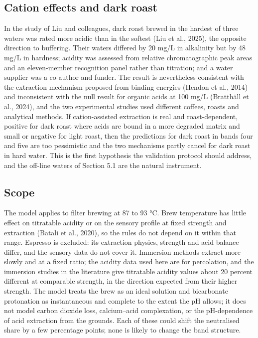 \documentclass[
  a4paper,
]{article}
\newcounter{none} %
\begin{document}
\subsection{Cation effects and dark
roast}\label{cation-effects-and-dark-roast}

In the study of Liu and colleagues, dark roast brewed in the hardest of
three waters was rated more acidic than in the softest (Liu et al.,
2025), the opposite direction to buffering. Their waters differed by 20
mg/L in alkalinity but by 48 mg/L in hardness; acidity was assessed from
relative chromatographic peak areas and an eleven-member recognition
panel rather than titration; and a water supplier was a co-author and
funder. The result is nevertheless consistent with the extraction
mechanism proposed from binding energies (Hendon et al., 2014) and
inconsistent with the null result for organic acids at 100 mg/L
(Bratthäll et al., 2024), and the two experimental studies used
different coffees, roasts and analytical methods. If cation-assisted
extraction is real and roast-dependent, positive for dark roast where
acids are bound in a more degraded matrix and small or negative for
light roast, then the predictions for dark roast in bands four and five
are too pessimistic and the two mechanisms partly cancel for dark roast
in hard water. This is the first hypothesis the validation protocol
should address, and the off-line waters of Section 5.1 are the natural
instrument.

\subsection{Scope}\label{scope}

The model applies to filter brewing at 87 to 93 °C. Brew temperature has
little effect on titratable acidity or on the sensory profile at fixed
strength and extraction (Batali et al., 2020), so the rules do not
depend on it within that range. Espresso is excluded: its extraction
physics, strength and acid balance differ, and the sensory data do not
cover it. Immersion methods extract more slowly and at a fixed ratio;
the acidity data used here are for percolation, and the immersion
studies in the literature give titratable acidity values about 20
percent different at comparable strength, in the direction expected from
their higher strength. The model treats the brew as an ideal solution
and bicarbonate protonation as instantaneous and complete to the extent
the pH allows; it does not model carbon dioxide loss, calcium--acid
complexation, or the pH-dependence of acid extraction from the grounds.
Each of these could shift the neutralised share by a few percentage
points; none is likely to change the band structure.
\end{document}
